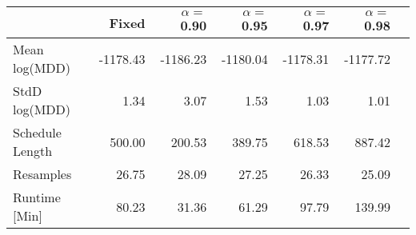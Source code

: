 \begin{tabular} {lrrrrrr} 
 \hline \hline 
&Fixed&$\alpha = $0.90&$\alpha = $0.95&$\alpha = $0.97&$\alpha = $0.98\\ 
 \hline 
Mean log(MDD)&-1178.43&-1186.23&-1180.04&-1178.31&-1177.72\\ 
StdD log(MDD)&1.34&3.07&1.53&1.03&1.01\\ 
Schedule Length&500.00&200.53&389.75&618.53&887.42\\ 
Resamples&26.75&28.09&27.25&26.33&25.09\\ 
Runtime [Min]&80.23&31.36&61.29&97.79&139.99\\ 
\hline 
\end{tabular}